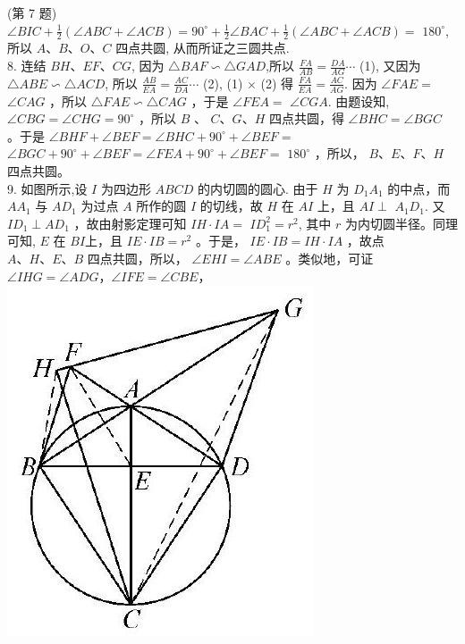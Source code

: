 \documentclass[10pt]{article}
\begin{document}
(第 7 题)\\
$\angle B I C+\frac{1}{2}(\angle A B C+\angle A C B)=90^{\circ}+\frac{1}{2} \angle B A C+\frac{1}{2}(\angle A B C+\angle A C B)=$ $180^{\circ}$, 所以 $A 、 B 、 O 、 C$ 四点共圆, 从而所证之三圆共点.\\
8. 连结 $B H 、 E F 、 C G$, 因为 $\triangle B A F \backsim \triangle G A D$,所以 $\frac{F A}{A B}=\frac{D A}{A G} \cdots$ (1), 又因为 $\triangle A B E \backsim \triangle A C D$, 所以 $\frac{A B}{E A}=\frac{A C}{D A} \cdots$ (2), (1) $\times$ (2) 得 $\frac{F A}{E A}=\frac{A C}{A G}$. 因为 $\angle F A E=$ $\angle C A G$ ，所以 $\triangle F A E \backsim \triangle C A G$ ，于是 $\angle F E A=$ $\angle C G A$. 由题设知, $\angle C B G=\angle C H G=90^{\circ}$ ，所以 $B$ 、 $C 、 G 、 H$ 四点共圆，得 $\angle B H C=\angle B G C$ 。于是 $\angle B H F+\angle B E F=\angle B H C+90^{\circ}+\angle B E F=$ $\angle B G C+90^{\circ}+\angle B E F=\angle F E A+90^{\circ}+\angle B E F=$ $180^{\circ}$ ，所以， $B 、 E 、 F 、 H$ 四点共圆。\\
9. 如图所示,设 $I$ 为四边形 $A B C D$ 的内切圆的圆心. 由于 $H$ 为 $D_{1} A_{1}$ 的中点，而 $A A_{1}$ 与 $A D_{1}$ 为过点 $A$ 所作的圆 $I$ 的切线，故 $H$ 在 $A I$ 上，且 $A I \perp$ $A_{1} D_{1}$. 又 $I D_{1} \perp A D_{1}$ ，故由射影定理可知 $I H \cdot I A=$ $I D_{1}^{2}=r^{2}$, 其中 $r$ 为内切圆半径。同理可知, $E$ 在 $B I$上，且 $I E \cdot I B=r^{2}$ 。于是， $I E \cdot I B=I H \cdot I A$ ，故点 $A 、 H 、 E 、 B$ 四点共圆，所以， $\angle E H I=\angle A B E$ 。类似地，可证 $\angle I H G=\angle A D G ， \angle I F E=\angle C B E ，$\\
\includegraphics[max width=\textwidth, center]{2024_10_30_66b8e5e701da2093c133g-097(1)}\\
\end{document}

